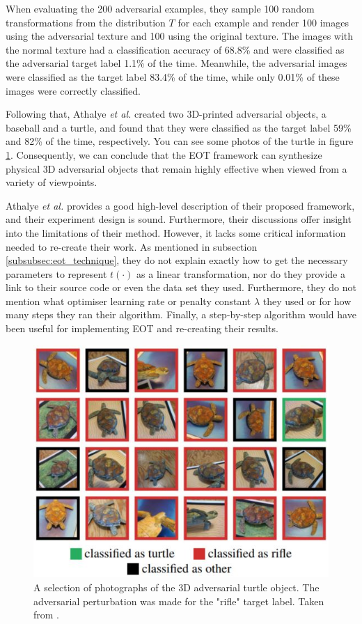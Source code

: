 When evaluating the 200 adversarial examples, they sample 100 random transformations from the distribution $T$ for each example and render 100 images using the adversarial texture and 100 using the original texture. The images with the normal texture had a classification accuracy of 68.8\% and were classified as the adversarial target label 1.1\% of the time. Meanwhile, the adversarial images were classified as the target label 83.4\% of the time, while only 0.01\% of these images were correctly classified.

Following that, Athalye \textit{et al.} created two 3D-printed adversarial objects, a baseball and a turtle, and found that they were classified as the target label 59\% and 82\% of the time, respectively. You can see some photos of the turtle in figure \ref{fig:3d_turtle}. Consequently, we can conclude that the EOT framework can synthesize physical 3D adversarial objects that remain highly effective when viewed from a variety of viewpoints.

Athalye \textit{et al.} \cite{athalye} provides a good high-level description of their proposed framework, and their experiment design is sound. Furthermore, their discussions offer insight into the limitations of their method. However, it lacks some critical information needed to re-create their work. As mentioned in subsection \ref{subsubsec:eot_technique}, they do not explain exactly how to get the necessary parameters to represent $t(\cdot)$ as a linear transformation, nor do they provide a link to their source code or even the data set they used. Furthermore, they do not mention what optimiser learning rate or penalty constant $\lambda$ they used or for how many steps they ran their algorithm. Finally, a step-by-step algorithm would have been useful for implementing EOT and re-creating their results.

\begin{figure}[h]
    \centering
    \includegraphics[width=1\textwidth]{graphics/turtle.JPG}
    \caption{A selection of photographs of the 3D adversarial turtle object. The adversarial perturbation was made for the "rifle" target label. Taken from \cite{athalye}.}
    \label{fig:3d_turtle}
\end{figure}

